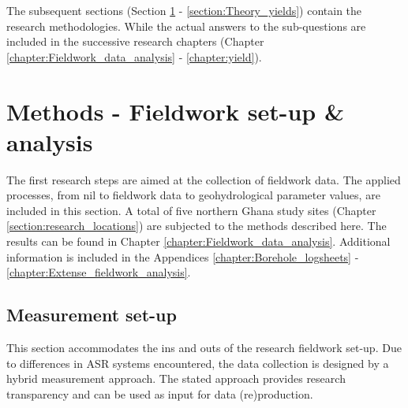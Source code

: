 The subsequent sections (Section \ref{section:Methods_fieldwork} - \ref{section:Theory_yields}) contain the research methodologies. While the actual answers to the sub-questions are included in the successive research chapters (Chapter \ref{chapter:Fieldwork_data_analysis} - \ref{chapter:yield}). \\

\section{Methods - Fieldwork set-up \& analysis}
\label{section:Methods_fieldwork}
The first research steps are aimed at the collection of fieldwork data. The applied processes, from nil to fieldwork data to geohydrological parameter values, are included in this section. A total of five northern Ghana study sites (Chapter \ref{section:research_locations}) are subjected to the methods described here. The results can be found in Chapter \ref{chapter:Fieldwork_data_analysis}. Additional information is included in the Appendices \ref{chapter:Borehole_logsheets} - \ref{chapter:Extense_fieldwork_analysis}.

\subsection{Measurement set-up}
\label{subsection:measurement_structure}
This section accommodates the ins and outs of the research fieldwork set-up. Due to differences in ASR systems encountered, the data collection is designed by a hybrid measurement approach. The stated approach provides research transparency and can be used as input for data (re)production. \\

